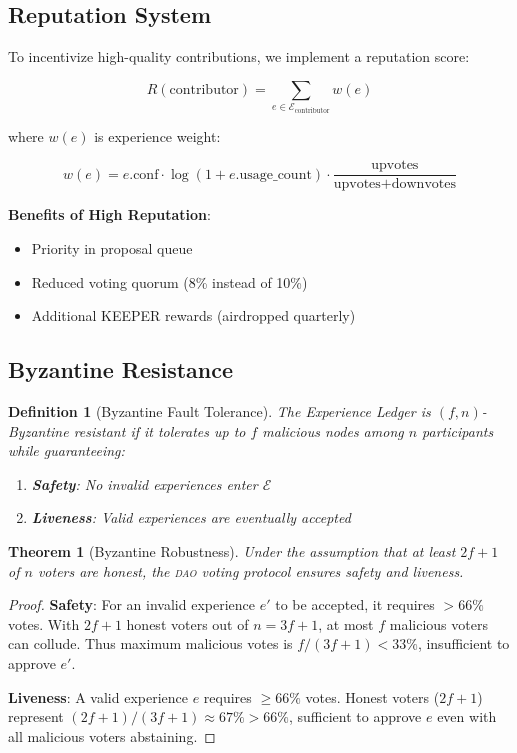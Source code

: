 \documentclass[11pt,letterpaper]{article}
\newtheorem{theorem}{Theorem}[section]
\newtheorem{definition}{Definition}[section]
\newcommand{\DAO}{\textsc{dao}}
\begin{document}
\subsection{Reputation System}

To incentivize high-quality contributions, we implement a reputation score:

\begin{equation}
R(\text{contributor}) = \sum_{e \in \mathcal{E}_{\text{contributor}}} w(e)
\end{equation}

where $w(e)$ is experience weight:

\begin{equation}
w(e) = e.\text{conf} \cdot \log(1 + e.\text{usage\_count}) \cdot \frac{\text{upvotes}}{\text{upvotes} + \text{downvotes}}
\end{equation}

\textbf{Benefits of High Reputation}:
\begin{itemize}
    \item Priority in proposal queue
    \item Reduced voting quorum (8\% instead of 10\%)
    \item Additional KEEPER rewards (airdropped quarterly)
\end{itemize}

\subsection{Byzantine Resistance}

\begin{definition}[Byzantine Fault Tolerance]
The Experience Ledger is $(f, n)$-Byzantine resistant if it tolerates up to $f$ malicious nodes among $n$ participants while guaranteeing:
\begin{enumerate}
    \item \textbf{Safety}: No invalid experiences enter $\mathcal{E}$
    \item \textbf{Liveness}: Valid experiences are eventually accepted
\end{enumerate}
\end{definition}

\begin{theorem}[Byzantine Robustness]
Under the assumption that at least $2f + 1$ of $n$ voters are honest, the \DAO{} voting protocol ensures safety and liveness.
\end{theorem}

\begin{proof}
\textbf{Safety}: For an invalid experience $e'$ to be accepted, it requires $> 66\%$ votes. With $2f + 1$ honest voters out of $n = 3f + 1$, at most $f$ malicious voters can collude. Thus maximum malicious votes is $f/(3f+1) < 33\%$, insufficient to approve $e'$.

\textbf{Liveness}: A valid experience $e$ requires $\geq 66\%$ votes. Honest voters ($2f+1$) represent $(2f+1)/(3f+1) \approx 67\% > 66\%$, sufficient to approve $e$ even with all malicious voters abstaining.
\end{proof}
\end{document}
